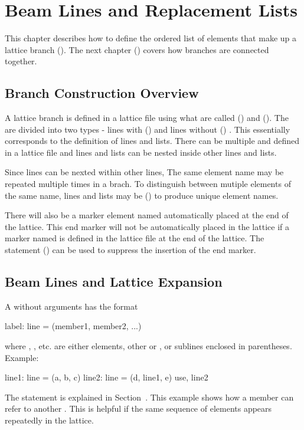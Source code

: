 \chapter{Beam Lines and Replacement Lists}
\label{c:sequence}

This chapter describes how to define the ordered list of 
elements that make up a lattice branch ().
The next chapter () covers how 
branches are connected together.

\section{Branch Construction Overview}
\label{s:branch.construct}

A lattice branch is defined in a lattice
file using what are called  () and 
 ().
The  are divided into two types - lines with 
() and lines without ()
. This essentially corresponds to the \mad
definition of lines and lists. There can be multiple 
and  defined in a lattice file and lines and
lists can be nested inside other lines and lists.

Since lines can be nexted within other lines, The same element name
may be repeated multiple times in a brach. To distinguish between
mutiple elements of the same name, lines and lists may be 
() to produce unique element names.



There will also be a marker element named  automatically
placed at the end of the lattice. This end marker will not be
automatically placed in the lattice if a marker named  is
defined in the lattice file at the end of the lattice. The
 statement () can be used
to suppress the insertion of the end marker.

\section{Beam Lines and Lattice Expansion}
\label{s:lines.wo.arg}

A  without arguments has the format
\begin{example}
  label: line = (member1, member2, ...)
\end{example}
where , , etc. are either elements, other  or , or sublines enclosed in parentheses.
Example:
\begin{example}
  line1: line = (a, b, c)
  line2: line = (d, line1, e)
  use, line2
\end{example}
The  statement is explained in Section~.
This example shows how a  member can refer to another
. This is helpful if the same sequence of elements
appears repeatedly in the lattice. 

